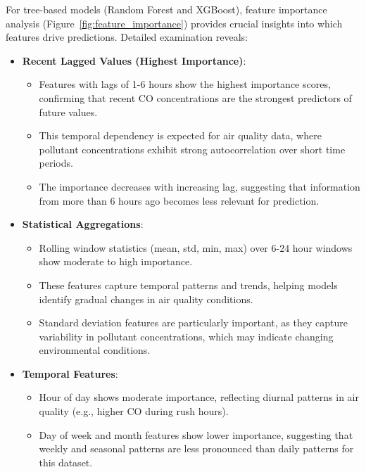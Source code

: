 \documentclass[12pt,a4paper]{article}
\begin{document}
For tree-based models (Random Forest and XGBoost), feature importance analysis (Figure~\ref{fig:feature_importance}) provides crucial insights into which features drive predictions. Detailed examination reveals:

\begin{itemize}
    \item \textbf{Recent Lagged Values (Highest Importance)}:
    \begin{itemize}
        \item Features with lags of 1-6 hours show the highest importance scores, confirming that recent CO concentrations are the strongest predictors of future values.
        \item This temporal dependency is expected for air quality data, where pollutant concentrations exhibit strong autocorrelation over short time periods.
        \item The importance decreases with increasing lag, suggesting that information from more than 6 hours ago becomes less relevant for prediction.
    \end{itemize}
    
    \item \textbf{Statistical Aggregations}:
    \begin{itemize}
        \item Rolling window statistics (mean, std, min, max) over 6-24 hour windows show moderate to high importance.
        \item These features capture temporal patterns and trends, helping models identify gradual changes in air quality conditions.
        \item Standard deviation features are particularly important, as they capture variability in pollutant concentrations, which may indicate changing environmental conditions.
    \end{itemize}
    
    \item \textbf{Temporal Features}:
    \begin{itemize}
        \item Hour of day shows moderate importance, reflecting diurnal patterns in air quality (e.g., higher CO during rush hours).
        \item Day of week and month features show lower importance, suggesting that weekly and seasonal patterns are less pronounced than daily patterns for this dataset.
    \end{itemize}
    

\end{itemize}
\end{document}
